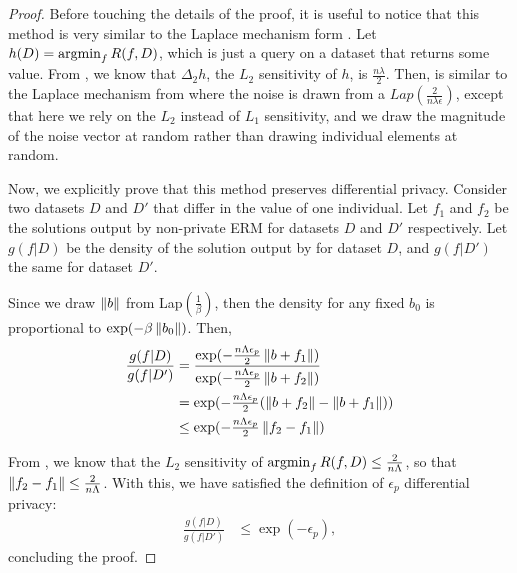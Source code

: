 \documentclass{article} %
\begin{document}
\begin{proof}
Before touching the details of the proof, it is useful to notice that this method
is very similar to the Laplace mechanism form .
Let $h(D) = \operatorname*{argmin}_f R(f, D)$, which is just a query on a dataset that
returns some value. From , we know that
$\Delta_2 h$, the $L_2$ sensitivity of $h$, is $\frac{n \lambda}{2}$. Then,
 is similar to the Laplace mechanism from
 where the noise is drawn from a
$Lap(\frac{2}{n \lambda \epsilon})$, except that here we rely on the $L_2$
instead of $L_1$ sensitivity, and we draw the magnitude of the noise vector at
random rather than drawing individual elements at random.

Now, we explicitly prove that this method preserves differential privacy.
Consider two datasets $D$ and $D'$ that differ in the value of one individual.
Let $f_1$ and $f_2$ be the solutions output by non-private ERM for datasets $D$
and $D'$ respectively. Let $g(f | D)$ be the density of the solution output by
 for dataset $D$, and $g(f | D')$ the same for dataset
$D'$.

Since we draw $\left\lVert b\right\rVert$ from Lap$(\frac{1}{\beta})$, then the density for
any fixed $b_0$ is proportional to $\exp(-\beta \left\lVert b_0\right\rVert)$. Then,
\begin{align*}
\frac{g(f | D)}{g(f | D')}
    &= \frac{
         \exp(-\tfrac{n\Lambda\epsilon_p}{2} \left\lVert b + f_1\right\rVert)
       }{
         \exp(-\tfrac{n\Lambda\epsilon_p}{2} \left\lVert b + f_2\right\rVert)
       } \\
    &= \exp(-\tfrac{n\Lambda\epsilon_p}{2} (\left\lVert b + f_2\right\rVert - \left\lVert b + f_1\right\rVert)) \\
    &\leq \exp(-\tfrac{n\Lambda\epsilon_p}{2} \left\lVert f_2 - f_1\right\rVert)
\end{align*}

From , we know that the $L_2$ sensitivity
of $\operatorname*{argmin}_f R(f, D) \leq \frac{2}{n \Lambda}$, so that
$\left\lVert f_2 - f_1\right\rVert \leq \frac{2}{n \Lambda}$. With this, we have satisfied the
definition of $\epsilon_p$ differential privacy:
\begin{align*}
\frac{g(f | D)}{g(f | D')} &\leq \exp(-\epsilon_p),
\end{align*}
concluding the proof.
\end{proof}
\end{document}
